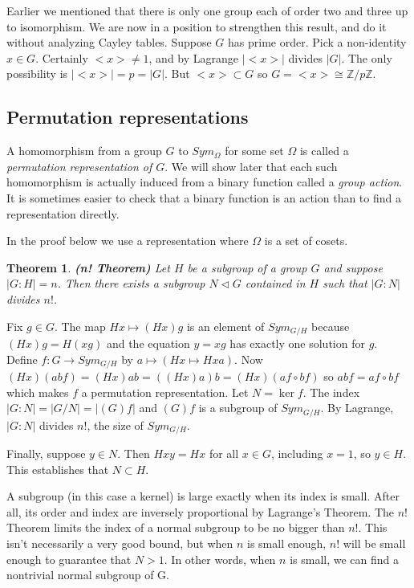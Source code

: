 \documentclass[letterpaper]{article}
\newtheorem{theorem}{Theorem}[section]
\newenvironment{proof}[1][Proof]{\begin{trivlist}
\item[\hskip \labelsep {\bfseries #1}]}{\end{trivlist}}
\begin{document}
Earlier we mentioned that there is only one group each of order two and three up to isomorphism. We are now in a position to strengthen this result, and do it without analyzing Cayley tables. Suppose $G$ has prime order. Pick a non-identity $x \in G$. Certainly ${<}x{>} \ne 1$, and by Lagrange $|{<}x{>}|$ divides $|G|$. The only possibility is $|{<}x{>}| = p = |G|$. But ${<}x{>} \subset G$ so $G = {<}x{>} \cong \mathbb{Z}/p\mathbb{Z}$.

\subsection{Permutation representations}

A homomorphism from a group $G$ to $Sym_\Omega$ for some set $\Omega$ is called a \emph{permutation representation of $G$}. We will show later that each such homomorphism is actually induced from a binary function called a \emph{group action}. It is sometimes easier to check that a binary function is an action than to find a representation directly.

In the proof below we use a representation where $\Omega$ is a set of cosets.

\begin{theorem}
\emph{\textbf{(n! Theorem)}}
Let $H$ be a subgroup of a group $G$ and suppose $|G\colon H| = n$. Then there exists a subgroup $N \lhd G$ contained in $H$ such that $|G \colon N|$ divides $n!$.
\end{theorem}
\begin{proof}
Fix $g \in G$. The map $Hx \mapsto (Hx)g$ is an element of $Sym_{G/H}$ because $(Hx)g = H(xg)$ and the equation $y = xg$ has exactly one solution for $g$. Define $f\colon G \rightarrow Sym_{G/H}$ by $a \mapsto (Hx \mapsto Hxa)$. Now $(Hx)(abf) = (Hx)ab = ((Hx)a)b = (Hx)(af \circ bf)$ so $abf = af \circ bf$ which makes $f$ a permutation representation. Let $N = \ker{f}$. The index $|G \colon N| = |G/N| = |(G)f|$ and $(G)f$ is a subgroup of $Sym_{G/H}$. By Lagrange, $|G \colon N|$ divides $n!$, the size of $Sym_{G/H}$.

Finally, suppose $y \in N$. Then $Hxy = Hx$ for all $x \in G$, including $x = 1$, so $y \in H$. This establishes that $N \subset H$.
\end{proof}

A subgroup (in this case a kernel) is large exactly when its index is small. After all, its order and index are inversely proportional by Lagrange's Theorem. The $n!$ Theorem limits the index of a normal subgroup to be no bigger than $n!$. This isn't necessarily a very good bound, but when $n$ is small enough, $n!$ will be small enough to guarantee that $N > 1$. In other words, when $n$ is small, we can find a nontrivial normal subgroup of G.
\end{document}
